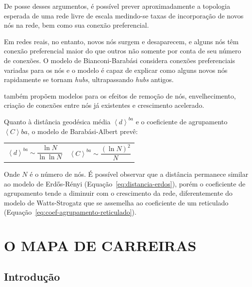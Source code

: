 \documentclass[12pt,a4paper,final]{article}
\newcommand{\avg}[1]{\left\langle #1 \right\rangle} %
\begin{document}
De posse desses argumentos, é possível prever aproximadamente a topologia esperada de uma rede livre de escala medindo-se taxas de incorporação de novos nós na rede, bem como sua conexão preferencial.

Em redes reais, no entanto, novos nós surgem e desaparecem, e alguns nós têm conexão preferencial maior do que outros não somente por conta de seu número de conexões. O modelo de Bianconi-Barabási considera conexões preferenciais variadas para os nós e o modelo é capaz de explicar como alguns novos nós rapidamente se tornam \textit{hubs}, ultrapassando \textit{hubs} antigos.

 também propõem modelos para os efeitos de remoção de nós, envelhecimento, criação de conexões entre nós já existentes e crescimento acelerado.

Quanto à distância geodésica média $\avg{d}^\textit{ba}$ e o coeficiente de agrupamento $\avg{C}\textit{ba}$, o modelo de Barabási-Albert prevê:

\noindent
\begin{tabularx}{\linewidth}{@{}XX@{}}
    \begin{equation} \label{eq:distancia-barabasi-albert}
    \avg{d}^\textit{ba} \sim \frac{\ln N}{\ln \ln N}
    \end{equation} &
    \begin{equation} \label{eq:coef-agrupamento-barabasi-albert}
    \avg{C}^\textit{ba} \sim \frac{(\ln N)^2}{N}
    \end{equation}
\end{tabularx}

Onde $N$ é o número de nós. É possível observar que a distância permanece similar ao modelo de Erdős-Rényi (Equação~\ref{eq:distancia-erdos}), porém o coeficiente de agrupamento tende a diminuir com o crescimento da rede, diferentemente do modelo de Watts-Strogatz que se assemelha ao coeficiente de um reticulado (Equação~\ref{eq:coef-agrupamento-reticulado}).


\section{O MAPA DE CARREIRAS}

\subsection{Introdução}
\end{document}
